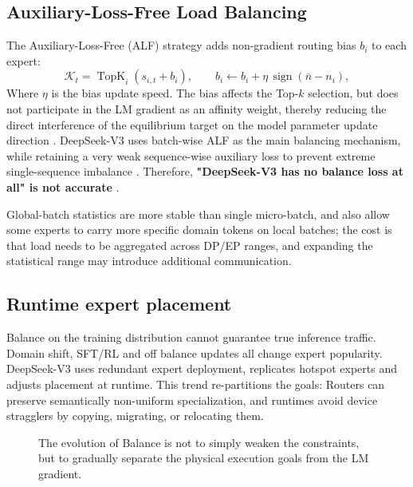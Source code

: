\documentclass[10pt,a4paper,fontset=none]{ctexart}
\newcommand{\term}[1]{\textbf{#1}}
\begin{document}
\subsection{Auxiliary-Loss-Free Load Balancing}

The Auxiliary-Loss-Free (ALF) strategy adds non-gradient routing bias $b_i$ to each expert:
\begin{equation}
  \mathcal{K}_t=\operatorname{TopK}_i(s_{i,t}+b_i),\qquad
  b_i\leftarrow b_i+\eta\,\operatorname{sign}(\bar n-n_i),
  \label{eq:alf}
\end{equation}
Where $\eta$ is the bias update speed. The bias affects the Top-$k$ selection, but does not participate in the LM gradient as an affinity weight, thereby reducing the direct interference of the equilibrium target on the model parameter update direction \cite{wang2024auxfree}. DeepSeek-V3 uses batch-wise ALF as the main balancing mechanism, while retaining a very weak sequence-wise auxiliary loss to prevent extreme single-sequence imbalance \cite{deepseekv3}. Therefore, \term{ "DeepSeek-V3 has no balance loss at all" is not accurate }.

Global-batch statistics are more stable than single micro-batch, and also allow some experts to carry more specific domain tokens on local batches; the cost is that load needs to be aggregated across DP/EP ranges, and expanding the statistical range may introduce additional communication.

\subsection{Runtime expert placement}

Balance on the training distribution cannot guarantee true inference traffic. Domain shift, SFT/RL and off balance updates all change expert popularity. DeepSeek-V3 uses redundant expert deployment, replicates hotspot experts and adjusts placement\cite{deepseekv3} at runtime. This trend re-partitions the goals: Routers can preserve semantically non-uniform specialization, and runtimes avoid device stragglers by copying, migrating, or relocating them.

\begin{figure}[htbp]
\centering
{}
\caption{The evolution of Balance is not to simply weaken the constraints, but to gradually separate the physical execution goals from the LM gradient.}
\label{fig:balance}
\end{figure}
\end{document}
